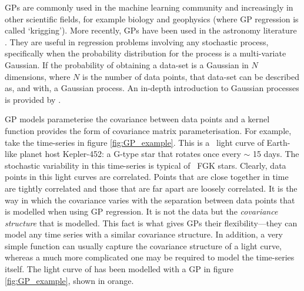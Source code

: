 GPs are commonly used in the machine learning community and increasingly
in other scientific fields, for example biology and geophysics (where GP
regression is called `krigging').
More recently, GPs have been used in the astronomy literature \citep[see
\eg][]{Gibson2012, Haywood2014, Haywood2015, Evans2015, Rajpaul2015,
Rajpaul2016, Aigrain2016}.
They are useful in regression problems involving any stochastic process,
specifically when the probability distribution for the process is a
multi-variate Gaussian.
If the probability of obtaining a data-set is a Gaussian in $N$ dimensions,
where $N$ is the number of data points, that data-set can be described as, and
with, a Gaussian process.
An in-depth introduction to Gaussian processes is provided by
\citet{Rasmussen2005}.

GP models parameterise the covariance between data points and a kernel
function provides the form of covariance matrix parameterisation.
For example, take the time-series in figure \ref{fig:GP_example}.
This is a \kepler\ light curve of Earth-like planet host Kepler-452: a G-type
star that rotates once every $\sim$ 15 days.
The stochastic variability in this time-series is typical of \kepler\ FGK
stars.
Clearly, data points in this light curves are correlated.
Points that are close together in time are tightly correlated and those that
are far apart are loosely correlated.
It is the way in which the covariance varies with the separation between data
points that is modelled when using GP regression.
It is not the data but the {\it covariance structure} that is modelled.
This fact is what gives GPs their flexibility---they can model any time
series with a similar covariance structure.
In addition, a very simple function can usually capture the covariance
structure of a light curve, whereas a much more complicated one may be
required to model the time-series itself.
The light curve of  has been modelled with a GP in figure
\ref{fig:GP_example}, shown in orange.

